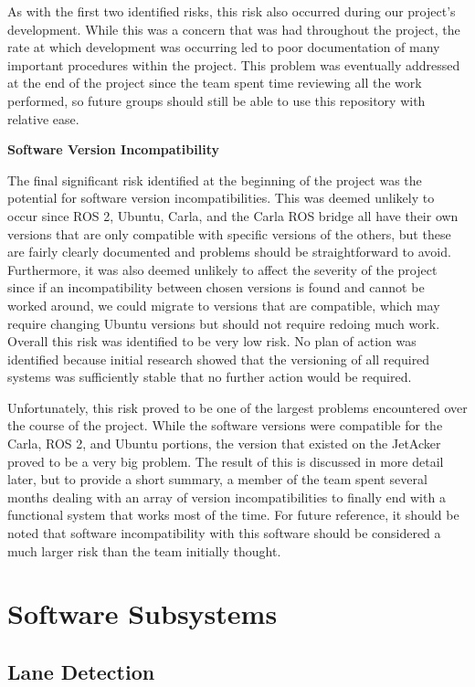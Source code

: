 \documentclass[titlepage,draft]{article}
\begin{document}
As with the first two identified risks, this risk also occurred during our project's development. While this was a concern that was had throughout the project, the rate at which development was occurring led to poor documentation of many important procedures within the project. This problem was eventually addressed at the end of the project since the team spent time reviewing all the work performed, so future groups should still be able to use this repository with relative ease.

\textbf{Software Version Incompatibility}

The final significant risk identified at the beginning of the project was the potential for software version incompatibilities. This was deemed unlikely to occur since ROS 2, Ubuntu, Carla, and the Carla ROS bridge all have their own versions that are only compatible with specific versions of the others, but these are fairly clearly documented and problems should be straightforward to avoid. Furthermore, it was also deemed unlikely to affect the severity of the project since if an incompatibility between chosen versions is found and cannot be worked around, we could migrate to versions that are compatible, which may require changing Ubuntu versions but should not require redoing much work. Overall this risk was identified to be very low risk. No plan of action was identified because initial research showed that the versioning of all required systems was sufficiently stable that no further action would be required.

Unfortunately, this risk proved to be one of the largest problems encountered over the course of the project. While the software versions were compatible for the Carla, ROS 2, and Ubuntu portions, the version that existed on the JetAcker proved to be a very big problem. The result of this is discussed in more detail later, but to provide a short summary, a member of the team spent several months dealing with an array of version incompatibilities to finally end with a functional system that works most of the time. For future reference, it should be noted that software incompatibility with this software should be considered a much larger risk than the team initially thought.


\section{Software Subsystems}

\subsection{Lane Detection}
\end{document}
